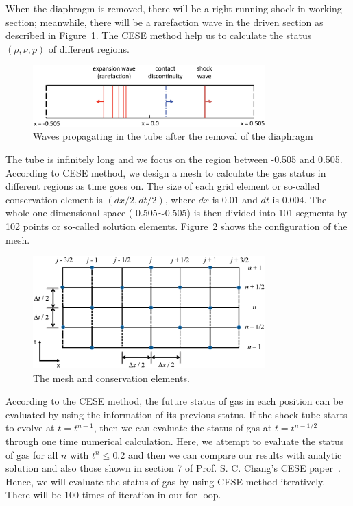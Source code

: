 \documentclass[a4paper,12pt,dvips]{article}
\begin{document}
When the diaphragm is removed, there will be a right-running shock in working 
section; meanwhile, there will be a rarefaction wave in the driven section as 
described in Figure~\ref{fig:sod_shock_tube_1D_no_diaphragm}. The CESE method 
help us to calculate the status $(\rho, \nu, p)$ of different regions.

 \begin{figure}[hbtp]
    \centering
     \includegraphics[width=0.8\textwidth]{sod_shock_tube_1D_no_diaphragm.eps}
     \caption{Waves propagating in the tube after the removal of the diaphragm}
     \label{fig:sod_shock_tube_1D_no_diaphragm}
 \end{figure}

The tube is infinitely long and we focus on the region between -0.505 and 0.505. 
According to CESE method, we design a mesh to calculate the gas status in 
different regions as time goes on. The size of each grid element or so-called 
conservation element is $(dx/2, dt/2)$, where $dx$ is 0.01 and $dt$ is 0.004. 
The whole one-dimensional space (-0.505$\sim$0.505) is then divided into 101 
segments by 102 points or so-called solution elements. 
Figure~\ref{fig:mesh_and_ce_v2} shows the configuration of the mesh. 

 \begin{figure}[ht]
    \centering
     \includegraphics[width=0.8\textwidth]{mesh_and_ce.eps}
     \caption{The mesh and conservation elements.}
     \label{fig:mesh_and_ce_v2}
 \end{figure}

According to the CESE method, the future status of gas in each position can be 
evaluated by using the information of its previous status. If the shock tube 
starts to evolve at $t=t^{n-1}$, then we can evaluate the status of gas at 
$t=t^{n-1/2}$ through one time numerical calculation. 
Here, we attempt to evaluate the status of gas for all $n$ with $t^{n}\leq0.2$ 
and then we can compare our results with analytic solution and also those shown 
in section 7 of Prof. S. C. Chang's CESE paper~\cite{CESE_Shin_Chung_Chang_1995}. 
Hence, we will evaluate the status of gas by using CESE method iteratively. 
There will be 100 times of iteration in our for loop.
\end{document}
